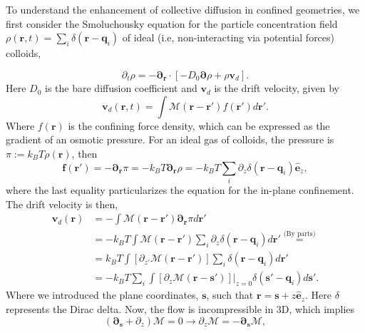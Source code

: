 \documentclass[ twoside,openright,titlepage,numbers=noenddot,%
headinclude,footinclude,cleardoublepage=empty,abstract=on,
BCOR=5mm,paper=b5,fontsize=11pt, dvipsnames
]{scrreprt}
\renewcommand{\vec}[1]{\bm{#1}}
\newcommand{\tens}[1]{\bm{\mathcal{#1}}}
\newcommand{\kT}{k_B T}
\newcommand{\ppos}{q}
\newcommand{\fpos}{r}
\newcommand{\fvel}{v}
\begin{document}
To understand the enhancement of collective diffusion in confined geometries, we first consider the Smoluchousky equation for the particle concentration field $\rho(\vec{\fpos}, t) = \sum_i\delta(\vec{\fpos} - \vec{\ppos}_i)$ of ideal (i.e, non-interacting via potential forces) colloids,

\begin{equation}
  \label{eq:smoludensq2D}
  \partial_t \rho = -\vec{\partial}_{\vec{\fpos}}\cdot\left[-D_0\vec{\partial}\rho + \rho\vec{\fvel}_d \right].
\end{equation}
Here $D_0$ is the bare diffusion coefficient and $\vec{\fvel}_d$ is the drift velocity, given by
\begin{equation}
  \vec{\fvel}_d(\vec{\fpos}, t) = \int\tens{M}(\vec{\fpos}-\vec{\fpos}') f(\vec{\fpos}') d\vec{\fpos}'.
\end{equation}
Where $f(\vec{\fpos})$ is the confining force density, which can be expressed as the gradient of an osmotic pressure. For an ideal gas of colloids, the pressure is $\pi := \kT \rho(\vec{\fpos})$, then
\begin{equation}
  \vec{f}(\vec{\fpos}') = -\vec{\partial}_{\vec{\fpos}}\pi = -\kT \vec{\partial}_{\vec{\fpos}}\rho = -\kT \sum_i \partial_z\delta(\vec{\fpos}-\vec{\ppos}_i) \hat{\vec{e}}_z,
\end{equation}
where the last equality particularizes the equation for the in-plane confinement. The drift velocity is then,
\begin{equation}
  \label{eq:driftq2d}
  \begin{aligned}
    \vec{\fvel}_d(\vec{\fpos}) &= -\int\tens{M}(\vec{\fpos}-\vec{\fpos}') \vec{\partial}_{\vec{\fpos}}\pi d\vec{\fpos}' \\
    &=-\kT\int\tens{M}(\vec{\fpos}-\vec{\fpos}') \sum_i \partial_z\delta(\vec{\fpos}-\vec{\ppos}_i) d\vec{\fpos}' \overset{\text{(By parts)}}{=}\\
    &=\kT\int \left[\partial_{z'}\tens{M}(\vec{\fpos}-\vec{\fpos}')\right] \sum_i \delta(\vec{\fpos}-\vec{\ppos}_i) d\vec{\fpos}'\\
    &= -\kT\sum_i\int \left[\partial_z \tens{M}(\vec{\fpos}-\vec{s}')\right]|_{z=0} \delta(\vec{s}' - \vec{\ppos}_i)d\vec{s}'.
  \end{aligned}
\end{equation}
Where we introduced the plane coordinates, $\vec{s}$, such that $\vec{\fpos} = \vec{s} + z\hat{\vec{e}}_z$. Here $\delta$ represents the Dirac delta.
Now, the flow is incompressible in 3D, which implies
\begin{equation}
  \label{eq:q2dtotalflow}
  (\vec{\partial}_{\vec{s}} + \partial_z)\tens{M} = 0 \rightarrow \partial_z\tens{M} = -\vec{\partial}_{\vec{s}}\tens{M},  
\end{equation}
\end{document}
